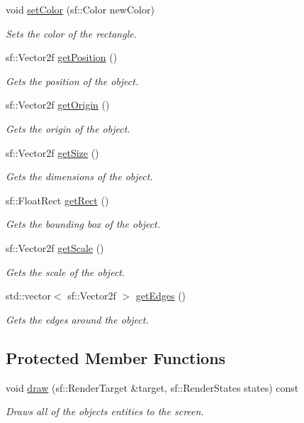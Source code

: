 \begin{DoxyCompactItemize}
void \hyperlink{class_object_afd817b216f79b53ef6fcb5a51fb6c8a5}{set\+Color} (sf\+::\+Color new\+Color)
\begin{DoxyCompactList}\small\item\em Sets the color of the rectangle. \end{DoxyCompactList}\item 
sf\+::\+Vector2f \hyperlink{class_object_aca7577fe05441fa619aad2b71ac8df8c}{get\+Position} ()
\begin{DoxyCompactList}\small\item\em Gets the position of the object. \end{DoxyCompactList}\item 
sf\+::\+Vector2f \hyperlink{class_object_a71573d7c00846463d2ef7220bab8f1eb}{get\+Origin} ()
\begin{DoxyCompactList}\small\item\em Gets the origin of the object. \end{DoxyCompactList}\item 
sf\+::\+Vector2f \hyperlink{class_object_acbdc3c4af57da23e7fe64c2c87ae924e}{get\+Size} ()
\begin{DoxyCompactList}\small\item\em Gets the dimensions of the object. \end{DoxyCompactList}\item 
sf\+::\+Float\+Rect \hyperlink{class_object_a9aae1a5a5a7365183937527a31cd2e46}{get\+Rect} ()
\begin{DoxyCompactList}\small\item\em Gets the bounding box of the object. \end{DoxyCompactList}\item 
sf\+::\+Vector2f \hyperlink{class_object_a582b0987634413023fdf6d93f7cfca36}{get\+Scale} ()
\begin{DoxyCompactList}\small\item\em Gets the scale of the object. \end{DoxyCompactList}\item 
std\+::vector$<$ sf\+::\+Vector2f $>$ \hyperlink{class_object_afb64c70e24bb001ecb8e6c0364e5a2d7}{get\+Edges} ()
\begin{DoxyCompactList}\small\item\em Gets the edges around the object. \end{DoxyCompactList}\end{DoxyCompactItemize}
\subsection*{Protected Member Functions}
\begin{DoxyCompactItemize}
\item 
void \hyperlink{class_object_a6c3dc18899c7d428b35b88b1474778d0}{draw} (sf\+::\+Render\+Target \&target, sf\+::\+Render\+States states) const
\begin{DoxyCompactList}\small\item\em Draws all of the object\textquotesingle{}s entities to the screen. \end{DoxyCompactList}\end{DoxyCompactItemize}
